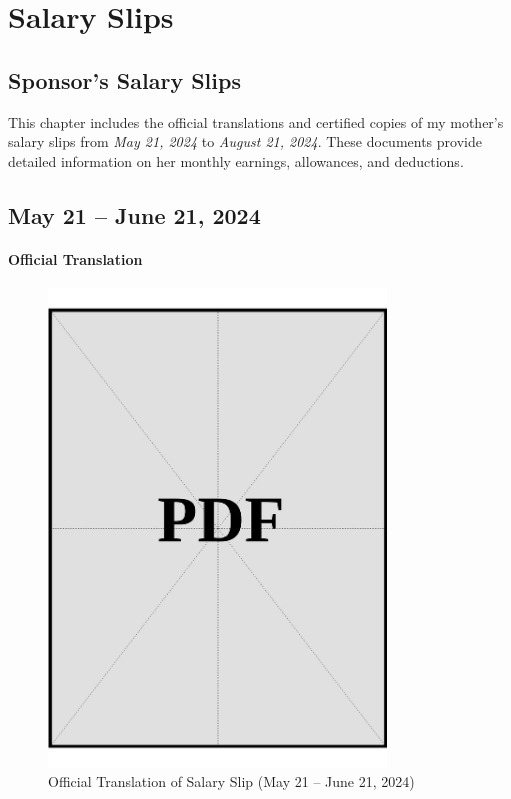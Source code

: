 \chapter{Salary Slips}\label{sec:salary-slips}

\section{Sponsor's Salary Slips}\label{sec:sponsor-salary-slips}
\noindent
This chapter includes the official translations and certified copies of my mother's salary slips from \textit{May 21, 2024} to \textit{August 21, 2024}. These documents provide detailed information on her monthly earnings, allowances, and deductions.

\clearpage

\section*{May 21 – June 21, 2024}

\subsubsection*{Official Translation}
\vspace*{\fill}
\begin{figure}[h]
    \centering
    \includegraphics[page=1, width=0.8\textwidth]{../application-docs/sponsor/funds/salary-slips/month-1/official-translations.pdf}
    \caption{Official Translation of Salary Slip (May 21 – June 21, 2024)}
    \label{fig:month-1-trans}
\end{figure}
\vspace*{\fill}

